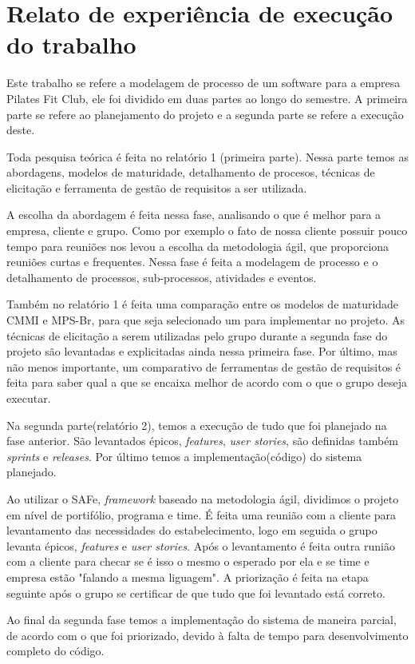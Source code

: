 \section[Relato de experiência de execução do trabalho]{Relato de experiência de execução do trabalho}
Este trabalho se refere a modelagem de processo de um software para a empresa
Pilates Fit Club, ele foi dividido em duas partes ao longo do semestre. A primeira
parte se refere ao planejamento do projeto e a segunda parte se
refere a execução deste.

Toda pesquisa teórica é feita no relatório 1 (primeira parte). Nessa parte temos
as abordagens, modelos de maturidade, detalhamento de procesos, técnicas de
elicitação e ferramenta de gestão de requisitos a ser utilizada.

A escolha da abordagem é feita nessa fase, analisando o que é melhor para a empresa, cliente
e grupo. Como por exemplo o fato de nossa cliente possuir pouco tempo para
reuniões nos levou a escolha da metodologia ágil, que proporciona reuniões
curtas e frequentes. Nessa fase é feita a modelagem de processo e o
detalhamento de processos, sub-processos, atividades e eventos.

Também no relatório 1 é feita uma comparação entre os modelos de maturidade CMMI
e MPS-Br, para que seja selecionado um para implementar no projeto. As técnicas
de elicitação a serem utilizadas pelo grupo durante a segunda fase do projeto
são levantadas e explicitadas ainda nessa primeira fase. Por último, mas não
menos importante, um comparativo de ferramentas de gestão de requisitos é feita
para saber qual a que se encaixa melhor de acordo com o que o grupo deseja
executar.

Na segunda parte(relatório 2), temos a execução de tudo que foi planejado na
fase anterior. São levantados épicos, \textsl{features}, \textsl{user stories},
são definidas também \textsl{sprints} e \textsl{releases}. Por último temos a
implementação(código) do sistema planejado.

Ao utilizar o SAFe, \textsl{framework} baseado na metodologia ágil,
dividimos o projeto em nível de portifólio, programa e time. É feita uma reunião
com a cliente para levantamento das necessidades do estabelecimento,
logo em seguida o grupo levanta épicos, \textsl{features} e
\textsl{user stories}. Após o levantamento é feita outra runião com a cliente
para checar se é isso o mesmo o esperado por ela e se time e empresa estão
"falando a mesma liguagem". A priorização é feita na etapa seguinte após o grupo
se certificar de que tudo que foi levantado está correto.

Ao final da segunda fase temos a implementação do sistema de maneira parcial, de
acordo com o que foi priorizado, devido à falta de tempo para desenvolvimento
completo do código.
